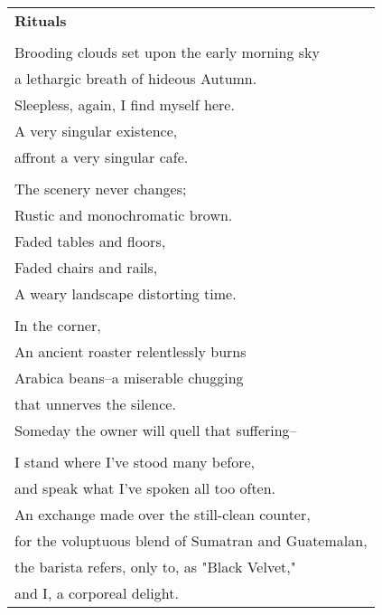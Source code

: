 \documentclass{article}
\begin{document}
\newcommand{\h}{\hspace{3ex}}
\newcommand{\hoar}{%
\begin{center}
\line(1,0){350}
\end{center}
}

\begin{center}
\begin{tabular}{l}
\textbf{Rituals} \\
\\
Brooding clouds set upon the early morning sky \\
a lethargic breath of hideous Autumn. \\
Sleepless, again, I find myself here. \\
A very singular existence, \\
affront a very singular cafe. \\
\\
The scenery never changes; \\
Rustic and monochromatic brown. \\
Faded tables and floors, \\
Faded chairs and rails, \\
A weary landscape distorting time. \\
\\
In the corner, \\
An ancient roaster relentlessly burns \\
Arabica beans--a miserable chugging \\
that unnerves the silence. \\
Someday the owner will quell that suffering-- \\
\\
I stand where I've stood many before, \\
and speak what I've spoken all too often. \\
An exchange made over the still-clean counter, \\
for the voluptuous blend of Sumatran and Guatemalan, \\
the barista refers, only to, as "Black Velvet," \\
and I, a corporeal delight. \\
\end{tabular}
\end{center}
\end{document}

